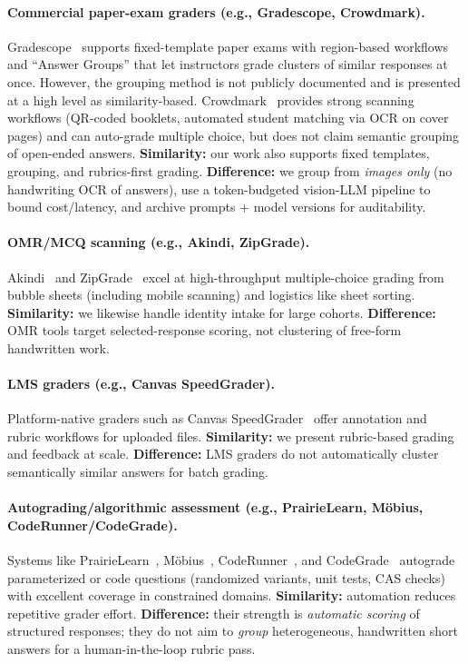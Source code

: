 \documentclass[ms,twoside,print]{nuthesis}
\newcommand{\Brand}[1]{\mbox{#1}} %
\begin{document}
\paragraph{Commercial paper-exam graders (e.g., \Brand{Gradescope}, \Brand{Crowdmark}).}
\Brand{Gradescope}~\cite{gradescope} supports fixed-template paper exams with region-based workflows and
\enquote{Answer Groups} that let instructors grade clusters of similar responses at once. However, the
grouping method is not publicly documented and is presented at a high level as similarity-based.
\Brand{Crowdmark}~\cite{crowdmark} provides strong scanning workflows (QR-coded booklets, automated
student matching via OCR on cover pages) and can auto-grade multiple choice, but does not claim
semantic grouping of open-ended answers. \textbf{Similarity:} our work also supports fixed templates,
grouping, and rubrics-first grading. \textbf{Difference:} we group from \emph{images only} (no handwriting
OCR of answers), use a token-budgeted vision-LLM pipeline to bound cost/latency, and archive
prompts + model versions for auditability.

\paragraph{OMR/MCQ scanning (e.g., \Brand{Akindi}, \Brand{ZipGrade}).}
\Brand{Akindi}~\cite{akindi} and \Brand{ZipGrade}~\cite{zipgrade} excel at high-throughput multiple-choice grading from
bubble sheets (including mobile scanning) and logistics like sheet sorting. \textbf{Similarity:} we likewise
handle identity intake for large cohorts. \textbf{Difference:} OMR tools target selected-response scoring,
not clustering of free-form handwritten work.

\paragraph{LMS graders (e.g., \Brand{Canvas} SpeedGrader).}
Platform-native graders such as \Brand{Canvas} SpeedGrader~\cite{canvas-speedgrader} offer annotation and rubric
workflows for uploaded files. \textbf{Similarity:} we present rubric-based grading and feedback at scale.
\textbf{Difference:} LMS graders do not automatically cluster semantically similar answers for batch grading.

\paragraph{Autograding/algorithmic assessment (e.g., \Brand{PrairieLearn}, \Brand{M{\"o}bius}, \Brand{CodeRunner}/\Brand{CodeGrade}).}
Systems like \Brand{PrairieLearn}~\cite{prairielearn}, \Brand{M{\"o}bius}~\cite{mobius}, \Brand{CodeRunner}~\cite{coderunner}, and
\Brand{CodeGrade}~\cite{codegrade} autograde parameterized or code questions (randomized variants, unit tests,
CAS checks) with excellent coverage in constrained domains. \textbf{Similarity:} automation reduces
repetitive grader effort. \textbf{Difference:} their strength is \emph{automatic scoring} of structured
responses; they do not aim to \emph{group} heterogeneous, handwritten short answers for a human-in-the-loop
rubric pass.
\end{document}
